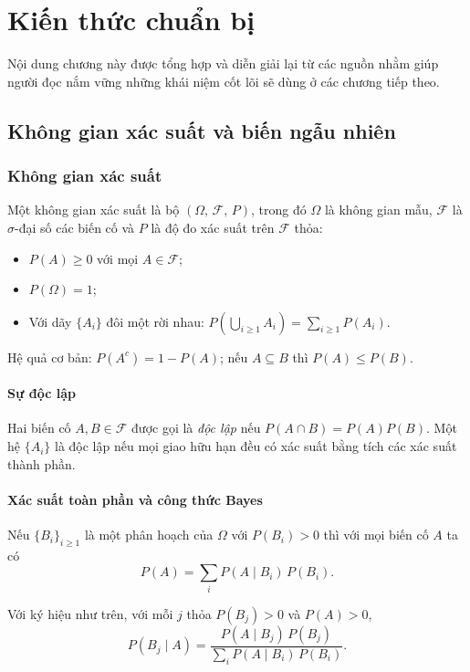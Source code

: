 \chapter{Kiến thức chuẩn bị}
Nội dung chương này được tổng hợp và diễn giải lại từ các nguồn \cite{nguyen1999, tran_nguyen1982, casella2002} nhằm giúp người đọc nắm vững những khái niệm cốt lõi sẽ dùng ở các chương tiếp theo.

\section{Không gian xác suất và biến ngẫu nhiên}

\subsection{Không gian xác suất}
\begin{dn}
Một không gian xác suất là bộ $(\Omega,\,\mathcal{F},\,P)$, trong đó $\Omega$ là không gian mẫu, $\mathcal{F}$ là $\sigma$-đại số các biến cố và $P$ là độ đo xác suất trên $\mathcal{F}$ thỏa:
\begin{itemize}
    \item $P(A)\ge0$ với mọi $A\in\mathcal{F}$;
    \item $P(\Omega)=1$;
    \item Với dãy $\{A_i\}$ đôi một rời nhau: $P\!\left(\bigcup_{i\ge1}A_i\right)=\sum_{i\ge1}P(A_i)$.
\end{itemize}
\end{dn}
\begin{tinhchat}
Hệ quả cơ bản: $P(A^c)=1-P(A)$; nếu $A\subseteq B$ thì $P(A)\le P(B)$.
\end{tinhchat}

\subsubsection*{Sự độc lập}
\begin{dn}
Hai biến cố $A,B\in\mathcal{F}$ được gọi là \emph{độc lập} nếu $P(A\cap B)=P(A)P(B)$. Một hệ $\{A_i\}$ là độc lập nếu mọi giao hữu hạn đều có xác suất bằng tích các xác suất thành phần.
\end{dn}

\subsubsection*{Xác suất toàn phần và công thức Bayes}
\begin{dl}
Nếu $\{B_i\}_{i\ge1}$ là một phân hoạch của $\Omega$ với $P(B_i)>0$ thì với mọi biến cố $A$ ta có
\[
P(A)=\sum_i P(A\mid B_i)\,P(B_i).
\]
\end{dl}
\begin{dl}
Với ký hiệu như trên, với mỗi $j$ thỏa $P(B_j)>0$ và $P(A)>0$,
\[
P(B_j\mid A)=\frac{P(A\mid B_j)\,P(B_j)}{\sum_i P(A\mid B_i)\,P(B_i)}.
\]
\end{dl}

